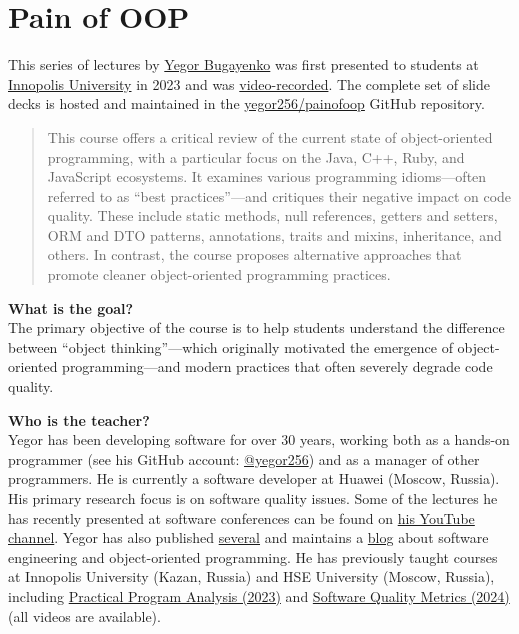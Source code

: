\documentclass[nobrand,anonymous,nodate,nosecurity]{huawei}
\begin{document}


\section*{Pain of OOP}

This series of lectures by \href{https://www.yegor256.com}{Yegor Bugayenko} was first presented to students at \href{https://innopolis.university/en/}{Innopolis University} in 2023 and was \href{https://www.youtube.com/playlist?list=PLaIsQH4uc08ytf8POIIAkkR4ZsRq8DFiV}{video-recorded}.
The complete set of slide decks is hosted and maintained in the \href{https://github.com/yegor256/painofoop}{yegor256/painofoop} GitHub repository.

\begin{abstract}
This course offers a critical review of the current state of object-oriented programming, with a particular focus on the Java, C++, Ruby, and JavaScript ecosystems.
It examines various programming idioms—often referred to as ``best practices''---and critiques their negative impact on code quality.
These include static methods, null references, getters and setters, ORM and DTO patterns, annotations, traits and mixins, inheritance, and others.
In contrast, the course proposes alternative approaches that promote cleaner object-oriented programming practices.
\end{abstract}

\textbf{What is the goal?}\\
The primary objective of the course is to help students understand the difference between ``object thinking''---which originally motivated the emergence of object-oriented programming---and modern practices that often severely degrade code quality.

\textbf{Who is the teacher?}\\
Yegor has been developing software for over 30 years, working both as a hands-on programmer (see his GitHub account: \href{https://github.com/yegor256}{@yegor256}) and as a manager of other programmers.
He is currently a software developer at Huawei (Moscow, Russia).
His primary research focus is on software quality issues.
Some of the lectures he has recently presented at software conferences can be found on \href{https://www.youtube.com/channel/UCr9qCdqXLm2SU0BIs6d_68Q}{his YouTube channel}.
Yegor has also published \href{https://www.yegor256.com/books.html}{several} and maintains a \href{https://www.yegor256.com/contents.html}{blog} about software engineering and object-oriented programming.
He has previously taught courses at Innopolis University (Kazan, Russia) and HSE University (Moscow, Russia), including \href{https://github.com/yegor256/ppa}{Practical Program Analysis (2023)} and \href{https://github.com/yegor256/sqm}{Software Quality Metrics (2024)} (all videos are available).
\end{document}

